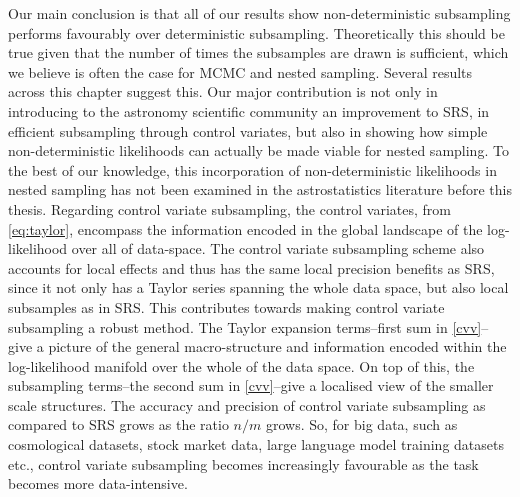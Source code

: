 Our main conclusion is that all of our results show non-deterministic subsampling performs favourably over deterministic subsampling. Theoretically this should be true given that the number of times the subsamples are drawn is sufficient, which we believe is often the case for MCMC and nested sampling. Several results across this chapter suggest this. Our major contribution is not only in introducing to the astronomy scientific community an improvement to SRS, in efficient subsampling through control variates, but also in showing how simple non-deterministic likelihoods can actually be made viable for nested sampling. To the best of our knowledge, this incorporation of non-deterministic likelihoods in nested sampling has not been examined in the astrostatistics literature before this thesis. Regarding control variate subsampling, the control variates, from \cref{eq:taylor}, encompass the information encoded in the global landscape of the log-likelihood over all of data-space. The control variate subsampling scheme also accounts for local effects and thus has the same local precision benefits as SRS, since it not only has a Taylor series spanning the whole data space, but also local subsamples as in SRS. This contributes towards making control variate subsampling a robust method. The Taylor expansion terms--first sum in \cref{cvv}--give a picture of the general macro-structure and information encoded within the log-likelihood manifold over the whole of the data space. On top of this, the subsampling terms--the second sum in \cref{cvv}--give a localised view of the smaller scale structures. The accuracy and precision of control variate subsampling as compared to SRS grows as the ratio $n/m$ grows. So, for big data, such as cosmological datasets, stock market data, large language model training datasets etc., control variate subsampling becomes increasingly favourable as the task becomes more data-intensive.

